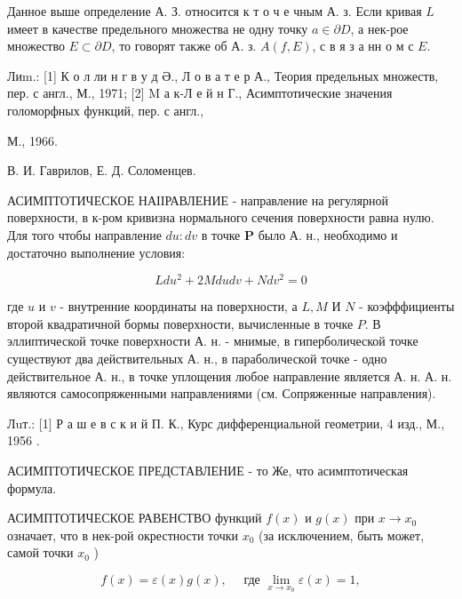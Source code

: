 \documentclass[10pt]{article}
\begin{document}
Данное выше определение А. З. относится к т о ч е чным А. з. Если кривая $L$ имеет в качестве предельного множества не одну точку $a \in \partial D$, а нек-рое множество $E \subset \partial D$, то говорят также об А. з. $A(f, E)$, с в я з а нн о м с $E$.



Лиm.: [1] К о л ли н г в у д Ә., Л о в а т е р А., Теория предельных множеств, пер. с англ., М., 1971; [2] M а к-Л е й н Г., Асимптотические значения голоморфных функций, пер. с англ.,

М., 1966.

В. И. Гаврилов, Е. Д. Соломенцев.



АСИМПТОТИЧЕСКОЕ НАІІРАВЛЕНИЕ - направление на регулярной поверхности, в к-ром кривизна нормального сечения поверхности равна нулю. Для того чтобы направление $d u: d v$ в точке $\boldsymbol{P}$ было А. н., необходимо и достаточно выполнение условия:



\[

L d u^{2}+2 M d u d v+N d v^{2}=0

\]



где $u$ и $v$ - внутренние координаты на поверхности, а $L, M$ И $N$ - коэфффициенты второй квадратичной бормы поверхности, вычисленные в точке $P$. В эллиптической точке поверхности А. н. - мнимые, в гиперболической точке существуют два действительных А. н., в параболической точке - одно действительное А. н., в точке уплощения любое направление является А. н. А. н. являются самосопряженными направлениями (см. Сопряженные направления).



Лuт.: [1] Р а ш е в с к и й П. К., Курс дифференциальной геометрии, 4 изд., М., 1956 .



АСИМПТОТИЧЕСКОЕ ПРЕДСТАВЛЕНИЕ - то Же, что асимптотическая формула.



АСИМПТОТИЧЕСКОЕ РАВЕНСТВО функций $f(x)$ и $g(x)$ при $x \rightarrow x_{0}$ означает, что в нек-рой окрестности точки $x_{0}$ (за исключением, быть может, самой точки $x_{0}$ )



\[

f(x)=\varepsilon(x) g(x), \quad \text { где } \lim _{x \rightarrow x_{0}} \varepsilon(x)=1,

\]
\end{document}
